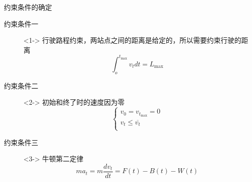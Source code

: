\documentclass{beamer}
\begin{document}
\begin{frame}{约束条件的确定}
\begin{description}
  \item[约束条件一]<1-> 行驶路程约束，两站点之间的距离是给定的，所以需要约束行驶的距离
    \[\int_o^{{t_{\max }}} {{v_t}dt}  = {L_{\max }}\]
  \item[约束条件二]<2-> 初始和终了时的速度因为零
    \[\left\{ \begin{array}{l}
 {v_0} = {v_{{t_{\max }}}} = 0 \\
 {v_t} \le \overline {{v_t}}  \\
 \end{array} \right.\]
  \item[约束条件三]<3-> 牛顿第二定律
    \[m{a_t} = m\frac{{d{v_t}}}{{dt}} = F\left( t \right) - B\left( t \right) - W\left( t \right)\]
\end{description}
\end{frame}
\end{document}
